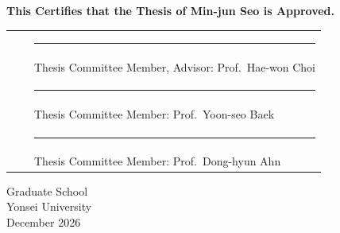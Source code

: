 \documentclass[12pt,a4paper]{report}
\begin{document}
\thispagestyle{empty}
\begin{center}
{\large\bfseries\color{yonseiblue} This Certifies that the Thesis of Min-jun Seo is Approved.}
\end{center}
\vspace{1.4cm}

\noindent
\begin{tabular}{@{}p{4cm}p{0.5cm}p{9.5cm}@{}}
 & & \rule{9.5cm}{0.4pt}\\[2pt]
 & & Thesis Committee Member, Advisor: Prof.\ Hae-won Choi\\[26pt]
 & & \rule{9.5cm}{0.4pt}\\[2pt]
 & & Thesis Committee Member: Prof.\ Yoon-seo Baek\\[26pt]
 & & \rule{9.5cm}{0.4pt}\\[2pt]
 & & Thesis Committee Member: Prof.\ Dong-hyun Ahn\\
\end{tabular}

\vspace{1.6cm}
\begin{center}
Graduate School\\
Yonsei University\\
December 2026
\end{center}

\clearpage

\onehalfspacing
























\end{document}

